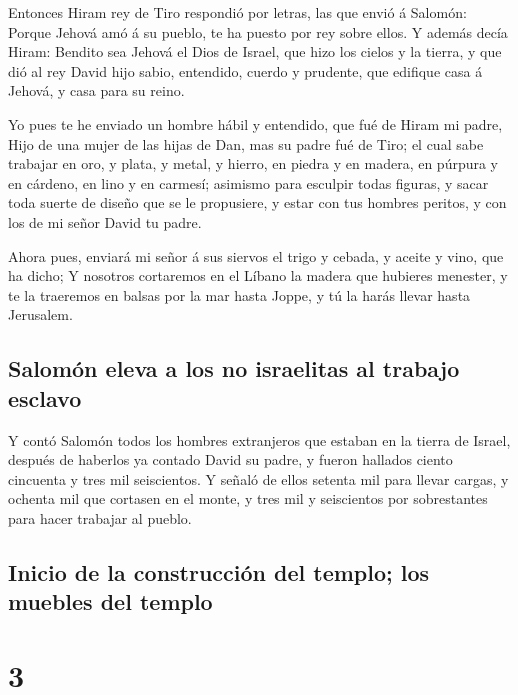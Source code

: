  Entonces Hiram rey de Tiro respondió por letras, las que
envió á Salomón: Porque Jehová amó á su pueblo, te ha puesto por rey
sobre ellos.  Y además decía Hiram: Bendito sea Jehová el
Dios de Israel, que hizo los cielos y la tierra, y que dió al rey David
hijo sabio, entendido, cuerdo y prudente, que edifique casa á Jehová, y
casa para su reino.

 Yo pues te he enviado un hombre hábil y entendido, que
fué de Hiram mi padre,  Hijo de una mujer de las hijas de
Dan, mas su padre fué de Tiro; el cual sabe trabajar en oro, y plata, y
metal, y hierro, en piedra y en madera, en púrpura y en cárdeno, en lino
y en carmesí; asimismo para esculpir todas figuras, y sacar toda suerte
de diseño que se le propusiere, y estar con tus hombres peritos, y con
los de mi señor David tu padre.

 Ahora pues, enviará mi señor á sus siervos el trigo y
cebada, y aceite y vino, que ha dicho;  Y nosotros
cortaremos en el Líbano la madera que hubieres menester, y te la
traeremos en balsas por la mar hasta Joppe, y tú la harás llevar hasta
Jerusalem.

\hypertarget{salomuxf3n-eleva-a-los-no-israelitas-al-trabajo-esclavo}{%
\subsection{Salomón eleva a los no israelitas al trabajo
esclavo}\label{salomuxf3n-eleva-a-los-no-israelitas-al-trabajo-esclavo}}

 Y contó Salomón todos los hombres extranjeros que
estaban en la tierra de Israel, después de haberlos ya contado David su
padre, y fueron hallados ciento cincuenta y tres mil seiscientos.
 Y señaló de ellos setenta mil para llevar cargas, y
ochenta mil que cortasen en el monte, y tres mil y seiscientos por
sobrestantes para hacer trabajar al pueblo.

\hypertarget{inicio-de-la-construcciuxf3n-del-templo-los-muebles-del-templo}{%
\subsection{Inicio de la construcción del templo; los muebles del
templo}\label{inicio-de-la-construcciuxf3n-del-templo-los-muebles-del-templo}}

\hypertarget{section-2}{%
\section{3}\label{section-2}}

